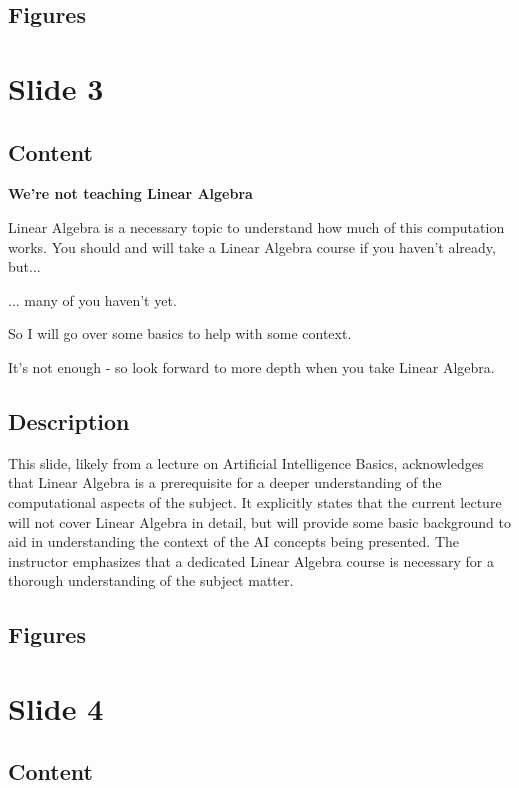 \documentclass{article}%
\begin{document}
\subsection{Figures}%
\begin{figure}[H]%
\centering%
\end{figure}

%
\newpage%
\section{Slide 3}%
\label{sec:Slide3}%
\subsection{Content}%

\textbf{We're not teaching Linear Algebra}

Linear Algebra is a necessary topic to understand how much of this computation works.
You should and will take a Linear Algebra course if you haven't already, but...

... many of you haven't yet.

So I will go over some basics to help with some context.

It's not enough - so look forward to more depth when you take Linear Algebra.
%
\subsection{Description}%
This slide, likely from a lecture on Artificial Intelligence Basics, acknowledges that Linear Algebra is a prerequisite for a deeper understanding of the computational aspects of the subject.  It explicitly states that the current lecture will not cover Linear Algebra in detail, but will provide some basic background to aid in understanding the context of the AI concepts being presented.  The instructor emphasizes that a dedicated Linear Algebra course is necessary for a thorough understanding of the subject matter.%
\subsection{Figures}%
\begin{figure}[H]%
\centering%
\end{figure}

%
\newpage%
\section{Slide 4}%
\label{sec:Slide4}%
\subsection{Content}%
\end{document}
